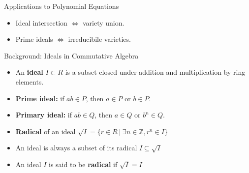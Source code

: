 \documentclass[11pt]{beamer}
\begin{document}

\begin{frame}{Applications to Polynomial Equations}
\begin{itemize}
  \item Ideal intersection $\Leftrightarrow$ variety union.
  \item Prime ideals $\Leftrightarrow$ irreducibile varieties.
\end{itemize}
\centering
{}
\end{frame}

\begin{frame}{Background: Ideals in Commutative Algebra}
\begin{itemize}
  \item An \textbf{ideal} $I \subset R$ is a subset closed under addition and multiplication by ring elements.
  \item \textbf{Prime ideal:} if $ab \in P$, then $a \in P$ or $b \in P$.
  \item \textbf{Primary ideal:} if $ab \in Q$, then $a \in Q$ or $b^n \in Q$.
  \item \textbf{Radical} of an ideal $\sqrt{I} = \{ r \in R \ | \ \exists n \in \mathbb{Z}, r^n \in I\}$
  \item An ideal is always a subset of its radical $I \subseteq \sqrt{I}$
  \item An ideal $I$ is said to be \textbf{radical} if $\sqrt{I} = I$
\end{itemize}
\end{frame}
\end{document}
